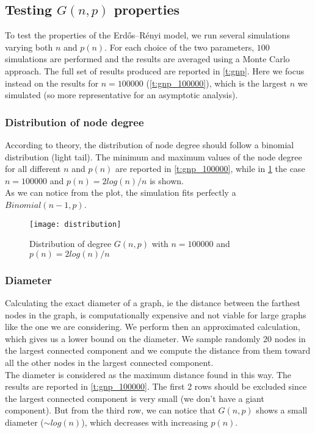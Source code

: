 \subsection{Testing $G(n,p)$ properties}

To test the properties of the Erdős–Rényi model, we run several simulations varying both $n$ and $p(n)$. For each choice of the two parameters, $100$ simulations are performed and the results are averaged using a Monte Carlo approach.
The full set of results produced are reported in \cref{t:gnp}. Here we focus instead on the results for $n=100000$ (\cref{t:gnp_100000}), which is the largest $n$ we simulated (so more representative for an asymptotic analysis).
\pagebreak
\subsubsection{Distribution of node degree}
According to theory, the distribution of node degree should follow a binomial distribution (light tail). 
The minimum and maximum values of the node degree for all different $n$ and $p(n)$ are reported in \cref{t:gnp_100000}, while in \cref{fig:3_distr} the case $n = 100000$ and $p(n) = 2log(n)/n$ is shown.\\ As we can notice from the plot, the simulation fits perfectly a $Binomial(n-1, p)$.

\begin{figure} [!ht]
	\centering
	\texttt{[image: distribution]}
	\caption{Distribution of degree $G(n,p)$ with $n = 100000$ and $p(n) = 2log(n)/n$}
	\label{fig:3_distr}
\end{figure}

\subsubsection{Diameter}
Calculating the exact diameter of a graph, ie the distance between the farthest nodes in the graph, is computationally expensive and not viable for large graphs like the one we are considering. We perform then an approximated calculation, which gives us a lower bound on the diameter. We sample randomly 20 nodes in the largest connected component and we compute the distance from them toward all the other nodes in the largest connected component.\\ The diameter is considered as the maximum distance found in this way. The results are reported in \cref{t:gnp_100000}. The first 2 rows should be excluded since the largest connected component is very small (we don't have a giant component). But from the third row, we can notice that $G(n,p)$ shows a small diameter ($\sim log(n)$), which decreases with increasing $p(n)$.

